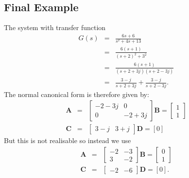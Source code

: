 \subsection*{Final Example}
 The system with transfer function
\begin{eqnarray*}G(s) &=& \frac{6s+6}{s^2 + 4s + 13}\\
&=& \frac{6(s+1)}{(s+2)^2 + 3^2} \\ &=&
\frac{6(s+1)}{(s+2+3j)(s+2-3j)}
\\ &=& \frac{3-j}{s+2+3j} + \frac{3-j}{s+2-3j}.\end{eqnarray*} The normal canonical form is
therefore given by:
\begin{eqnarray*}
\mathbf{A} &=& \left[\begin{array}{cc}
  -2-3j & 0 \\
  0 & -2+3j
\end{array}\right] \mathbf{B} = \left[\begin{array}{c}
  1 \\
  1
\end{array}\right]\\ \mathbf{C} &=& \left[\begin{array}{cc}
  3-j & 3+j
\end{array}\right] \mathbf{D} = \left[0\right]
\end{eqnarray*}
But this is not realisable so instead we use
\begin{eqnarray*}
\mathbf{A} &=& \left[\begin{array}{cc}
  -2 & -3 \\
  3 & -2
\end{array}\right] \mathbf{B} = \left[\begin{array}{c}
  0 \\
  1
\end{array}\right]\\ \mathbf{C} &=& \left[\begin{array}{cc}
  -2 & -6
\end{array}\right] \mathbf{D} = \left[0\right].
\end{eqnarray*}




\endinput

